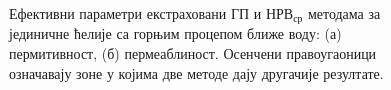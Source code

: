 \begin{figure}[!t]
\centering
{}
\caption{Ефективни параметри екстраховани ГП и $НРВ_{ср}$ методама за јединичне ћелије са горњим процепом ближе воду: (а) пермитивност, (б) пермеаблиност. Осенчени правоугаоници означавају зоне у којима две методе дају другачије резултате.}
\label{fig14_2}
\end{figure}
